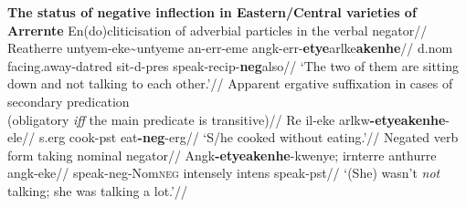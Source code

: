 \pex \textbf{The status of negative inflection in Eastern/Central varieties of Arrernte}
	\a\begingl\glpreamble En(do)cliticisation of adverbial particles in the verbal negator//
	\gla Re\textdblhyphen atherre untyem-eke\textasciitilde untyeme an-err-eme angk-err-\textbf{etye}\guillemotleft arlke\guillemotright \textbf{akenhe}//
		\gls{d}.\gls{nom} facing.away-\gls{dat}\textdblhyphen\gls{red} sit-\gls{d}-\gls{pres} speak-\gls{recip}-\textbf{\gls{neg}}\guillemotleft also\guillemotright//
		\glft`The two of them are sitting down and not talking to each other.'//
		\endgl
	\a\begingl\glpreamble Apparent ergative suffixation in cases of secondary predication\\(obligatory \textsl{iff} the main predicate is transitive)//
		\gla Re il-eke arlkw\textbf{-etye\textdblhyphen akenhe}-ele//
		\gls{s}.\gls{erg} cook-\gls{pst} eat\textbf{-\gls{neg}}-\gls{erg}//
		\glft`S/he cooked without eating.'//\endgl
		\a\begingl\glpreamble Negated verb form taking nominal negator//
		\gla Angk\textbf{-etye\textdblhyphen akenhe}-kwenye; irnterre anthurre angk-eke//
		\glb speak-\gls{neg}-Nom\textsc{neg} intensely \gls{intens} speak-\gls{pst}//
		\glft`(She) wasn't \textit{not} talking; she was talking a lot.'//\endgl
\xe

